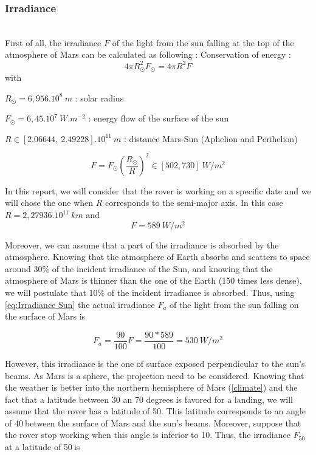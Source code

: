 \subsubsection{Irradiance}
\label{Irradiance}
~\\
First of all, the irradiance $F$ of the light from the sun falling at the top of the atmosphere of Mars can be calculated as following :
Conservation of energy :
\begin{equation}
\label{eq:conservation of energy}
4\pi R_\odot^2F_\odot=4\pi R^2F
\end{equation}
with 

$R_\odot=6,956.10^8\ m$ : solar radius

$F_\odot=6,45.10^7\ W.m^{-2}$ : energy flow of the surface of the sun

$R \in [2.06644,\ 2.49228].10^{11} \ m$ : distance Mars-Sun (Aphelion and Perihelion)

\begin{equation}
\label{eq:Irradiance Sun range}
F = F_\odot \left(\frac{R_\odot}{R}\right)^2 \in [502, 730]\ W/m^2
\end{equation}

In this report, we will consider that the rover is working on a specific date and we will chose the one when $R$ corresponds to the semi-major axis. In this case $R=2,27936.10^{11}\ km$ and
\begin{equation}
\label{eq:Irradiance Sun}
F = 589\ W/m^2
\end{equation}



Moreover, we can assume that a part of the irradiance is absorbed by the atmosphere. Knowing that the atmosphere of Earth absorbs and scatters to space around 30\% of the incident irradiance of the Sun\cite{yamamoto1962direct}, and knowing  that the atmosphere of Mars is thinner than the one of the Earth (150 times less dense), we will postulate that 10\% of the incident irradiance is absorbed. Thus, using \eqref{eq:Irradiance Sun} the actual irradiance $F_a$ of the light from the sun falling on the surface of Mars is

\begin{equation}
\label{eq:Actual Irradiance Sun}
F_a = \frac{90}{100}F = \frac{90*589}{100} = 530\ W/m^2
\end{equation}

However, this irradiance is the one of surface exposed perpendicular to the sun's beams. As Mars is a sphere, the projection need to be considered.
Knowing that the weather is better into the northern hemisphere of Mars (\ref{climate}) and the fact that a latitude between 30 an 70 degrees is favored for a landing\cite{latitude}, we will assume that the rover has a latitude of 50\textdegree. This latitude corresponds to an angle of 40\textdegree$\ $between the surface of Mars and the sun's beams. Moreover, suppose that the rover stop working when this angle is inferior to 10\textdegree. Thus, the irradiance $F_{50}$ at a latitude of 50\textdegree$\ $is

